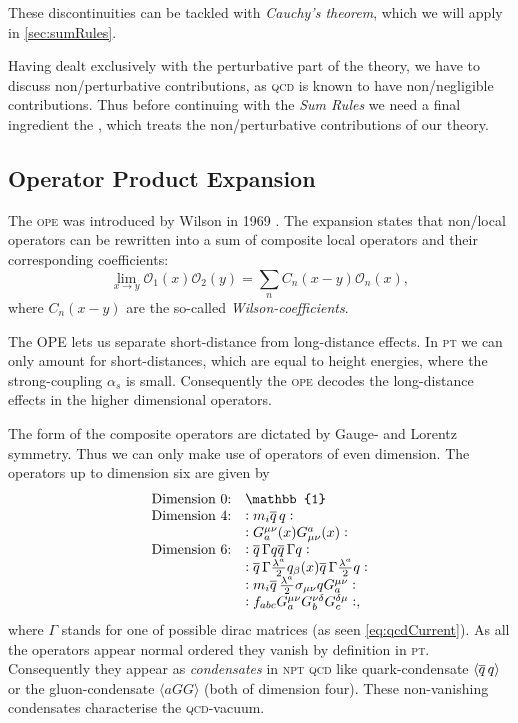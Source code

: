 \documentclass[../../index.tex]{subfiles}
\begin{document}
These discontinuities can be tackled with \textit{Cauchy's theorem}, which we
will apply in \cref{sec:sumRules}.

Having dealt exclusively with the perturbative part of the theory, we have to
discuss non\-/perturbative contributions, as \textsc{qcd} is known to have
non\-/negligible contributions. Thus before continuing with the \textit{Sum
  Rules} we need a final ingredient the , which treats the non\-/perturbative contributions of our theory.




\subsection{Operator Product Expansion}
The \textsc{ope} was introduced by Wilson in 1969 \cite{Wilson1969}. The
expansion states that non\-/local operators can be rewritten into a sum of
composite local operators and their corresponding coefficients:
\begin{equation}
  \label{eq:ope}
  \lim_{x\to y} \mathcal{O}_1(x) \mathcal{O}_2(y) = \sum_n C_n(x-y)\mathcal{O}_n(x),
\end{equation}
where $C_n(x-y)$ are the so-called \textit{Wilson-coefficients}.

The OPE lets us separate short-distance from long-distance effects. In
\textsc{pt} we can only amount for short-distances, which are equal to height
energies, where the strong-coupling $\alpha_s$ is small. Consequently the
\textsc{ope} decodes the long-distance effects in the higher dimensional
operators.

The form of the composite operators are dictated by Gauge- and Lorentz symmetry.
Thus we can only make use of operators of even dimension. The operators up to
dimension six are given by \cite{Pascual1984}
\begin{equation}
  \begin{array}{ll}
    \text{Dimension 0:} & \mathbb{1} \\
    \text{Dimension 4:} & :m_i \anti{q} q: \\
                        & :G_a^{\mu\nu}(x) G_{\mu\nu}^a(x): \\
    \text{Dimension 6:} & :\anti{q} \Gamma q \anti{q} \Gamma q: \\
                        & :\anti{q} \Gamma \frac{\lambda^a}{2} q_\beta(x) \anti{q} \Gamma \frac{\lambda^a}{2} q: \\
                        & :m_i \anti{q} \frac{\lambda^a}{2} \sigma_{\mu\nu} q G^{\mu\nu}_a: \\
                        & :f_{abc} G_a^{\mu\nu} G_b^{\nu\delta} G_c^{\delta\mu}:,
  \end{array}
\end{equation}
where $\Gamma$ stands for one of possible dirac matrices (as seen
\cref{eq:qcdCurrent}). As all the operators appear normal ordered they vanish by
definition in \textsc{pt}. Consequently they appear as \textit{condensates} in
\textsc{npt qcd} like quark-condensate $\langle \overline{q}\, q \rangle$ or the
gluon-condensate $\langle a GG \rangle$ (both of dimension four). These
non-vanishing condensates characterise the \textsc{qcd}-vacuum.
\end{document}
